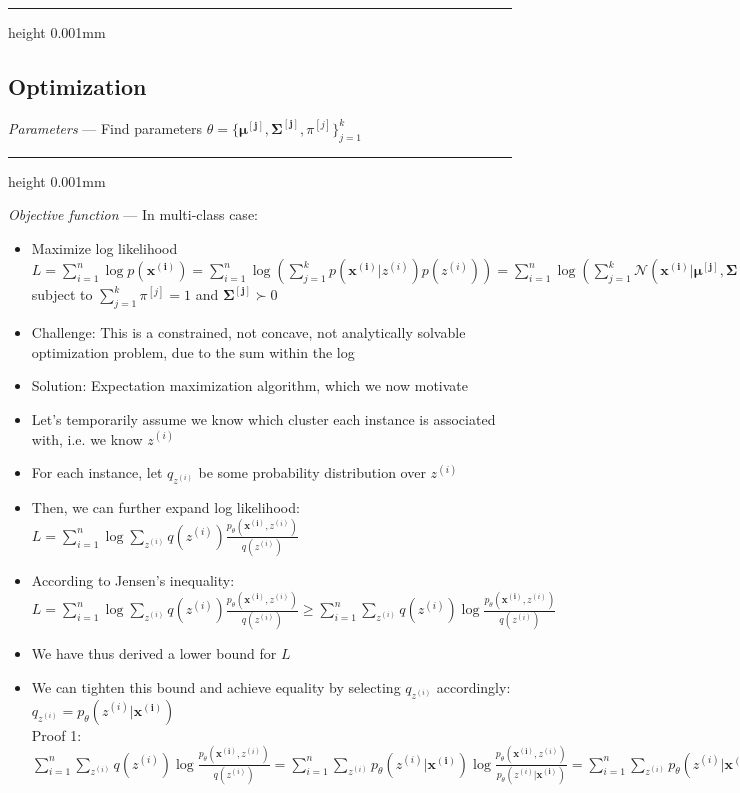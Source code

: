 {\color{black}\hrule height 0.001mm}

\subsection*{Optimization}
\emph{Parameters} --- Find parameters $\theta = \{\boldsymbol{\mu^{[j]}}, \boldsymbol{\Sigma^{[j]}}, \pi^{[j]}\}_{j=1}^k$

{\color{lightgray}\hrule height 0.001mm}

\emph{Objective function} --- 
In multi-class case:
\begin{itemize}
    \item Maximize log likelihood $L = \sum_{i=1}^n \log p( \boldsymbol{x^{(i)}}) = \sum_{i=1}^n \log (\sum_{j=1}^k p(\boldsymbol{x^{(i)}} | z^{(i)}) p(z^{(i)})) = \sum_{i=1}^n \log( \sum_{j=1}^k \mathcal{N}(\boldsymbol{x^{(i)}} | \boldsymbol{\mu^{[j]}}, \boldsymbol{\Sigma^{[j]}}) \times \pi^{[j]} ) $ subject to $\sum_{j=1}^k \pi^{[j]} = 1$ and $\boldsymbol{\Sigma^{[j]}} \succ 0$
    \item Challenge: This is a constrained, not concave, not analytically solvable optimization problem, due to the sum within the log
    \item Solution: Expectation maximization algorithm, which we now motivate 
    \item Let's temporarily assume we know which cluster each instance is associated with, i.e. we know $z^{(i)}$
    \item For each instance, let $q_{z^{(i)}}$ be some probability distribution over $z^{(i)}$
    \item Then, we can further expand log likelihood: $L = \sum_{i=1}^n \log \sum_{z^{(i)}} q(z^{(i)}) \frac{p_\theta( \boldsymbol{x^{(i)}}, z^{(i)})}{q(z^{(i)})}$
    \item According to Jensen's inequality: $L = \sum_{i=1}^n \log \sum_{z^{(i)}} q(z^{(i)}) \frac{p_\theta( \boldsymbol{x^{(i)}}, z^{(i)})}{q(z^{(i)})} \geq \sum_{i=1}^n \sum_{z^{(i)}} q(z^{(i)}) \log \frac{p_\theta( \boldsymbol{x^{(i)}}, z^{(i)})}{q(z^{(i)})}$
    \item We have thus derived a lower bound for $L$
    \item We can tighten this bound and achieve equality by selecting $q_{z^{(i)}}$ accordingly: $q_{z^{(i)}} = p_\theta( z^{(i)} |\boldsymbol{x^{(i)}})$\\
    Proof 1:\\
    $\sum_{i=1}^n \sum_{z^{(i)}} q(z^{(i)}) \log \frac{p_\theta( \boldsymbol{x^{(i)}}, z^{(i)})}{q(z^{(i)})} = \sum_{i=1}^n \sum_{z^{(i)}} p_\theta( z^{(i)} |\boldsymbol{x^{(i)}}) \log \frac{p_\theta( \boldsymbol{x^{(i)}}, z^{(i)})}{p_\theta( z^{(i)} |\boldsymbol{x^{(i)}})} = \sum_{i=1}^n \sum_{z^{(i)}} p_\theta( z^{(i)} |\boldsymbol{x^{(i)}}) \log \frac{p_\theta( \boldsymbol{x^{(i)}}) p_\theta( z^{(i)} |\boldsymbol{x^{(i)}})}{p_\theta( z^{(i)} |\boldsymbol{x^{(i)}})} = \sum_{i=1}^n \sum_{z^{(i)}} p_\theta( z^{(i)} |\boldsymbol{x^{(i)}}) \log p_\theta( \boldsymbol{x^{(i)}}) = \sum_{i=1}^n \times 1 \times \log p_\theta( \boldsymbol{x^{(i)}}) = L$\\

\end{itemize}
